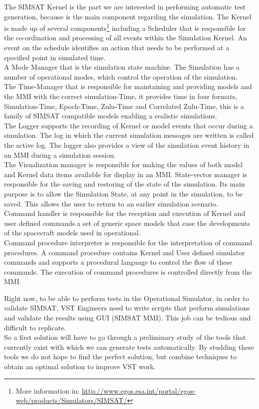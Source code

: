 The \ac{SIMSAT} Kernel is the part we are interested in performing automatic test generation, because is the main component regarding the simulation.
The Kernel is made up of several components\footnote{More information in: \url{http://www.egos.esa.int/portal/egos-web/products/Simulators/SIMSAT/}} including
a Scheduler that is responsible for the co-ordination and processing of all events within the Simulation Kernel.
An event on the schedule identifies an action that needs to be performed at a specified point in simulated time.\\
A Mode Manager that is the simulation state machine. The Simulation has a number of operational modes, which control the operation of the simulation.\\
The Time-Manager that is responsible for maintaining and providing models and the \ac{MMI} with the correct simulation-Time,
it provides time in four formats, Simulation-Time, Epoch-Time, Zulu-Time and Correlated Zulu-Time, this is a family of \ac{SIMSAT}
compatible models enabling a realistic simulations.\\
The Logger supports the recording of Kernel or model events that occur during a simulation.
The log in which the current simulation messages are written is called the active log.
The logger also provides a view of the simulation event history in an \ac{MMI} during a simulation session.\\
The Visualization manager is responsible for making the values of both model and Kernel data items available for display in an \ac{MMI}.
State-vector manager is responsible for the saving and restoring of the state of the simulation. Its main purpose is to allow the Simulation State, at any point in the simulation, to be saved. This allows the user to return to an earlier simulation scenario.\\
Command handler is responsible for the reception and execution of Kernel and user defined commands.a set of generic space models that ease the developments of the spacecraft models used in operational.\\
Command procedure interpreter is responsible for the interpretation of command procedures.
A command procedure contains Kernel and User defined simulator commands and supports a procedural language to control the flow of these commands.
The execution of command procedures is controlled directly from the \ac{MMI}\cite{1996ESASP.394..399L}.

Right now, to be able to perform tests in the Operational Simulator, in order to validate \ac{SIMSAT}, \ac{VST} Engineers need to write scripts that
perform simulations and validate the results using \ac{GUI} (\ac{SIMSAT} \ac{MMI}). This job can be tedious and difficult to replicate.\\
So a first solution will have to go through a preliminary study of the tools
that currently exist with which we can generate tests automatically.
By studding these tools we do not hope to find the perfect solution, but combine techniques to obtain an optimal solution to improve \ac{VST} work.
